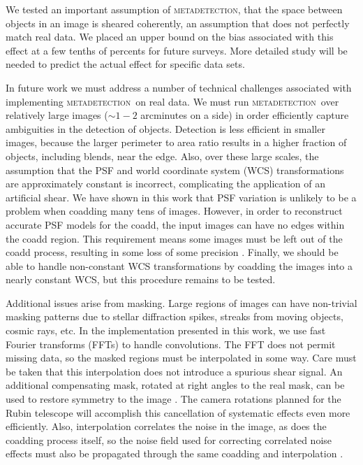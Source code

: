 \documentclass[draft, iop, twocolappendix, appendixfloats, numberedappendix, apj]{hackemulateapj}
\newcommand{\mdet}{\textsc{metadetection}}
\begin{document}
We tested an important assumption of \mdet, that the space between objects in
an image is sheared coherently, an assumption that does not perfectly match
real data.  We placed an upper bound on the bias associated with this effect at
a few tenths of percents for future surveys. More detailed study will be needed
to predict the actual effect for specific data sets.

In future work we must address a number of technical challenges associated with
implementing \mdet\ on real data.  We must run \mdet\ over relatively large
images ($\sim1-2$ arcminutes on a side) in order efficiently capture
ambiguities in the detection of objects.  Detection is less efficient in
smaller images, because the larger perimeter to area ratio results in a higher
fraction of objects, including blends, near the edge.  Also, over these large
scales, the assumption that the PSF and world coordinate system (WCS)
transformations are approximately constant is incorrect, complicating the
application of an artificial shear. We have shown in this work that PSF
variation is unlikely to be a problem when coadding many tens of images.
However, in order to reconstruct accurate PSF models for the coadd, the input
images can have no edges within the coadd region. This requirement means some
images must be left out of the coadd process, resulting in some loss of some
precision \citep{ArmstrongCoadd}. Finally, we should be able to handle
non-constant WCS transformations by coadding the images into a nearly constant
WCS, but this procedure remains to be tested.

Additional issues arise from masking. Large regions of images can have
non-trivial masking patterns due to stellar diffraction spikes, streaks from
moving objects, cosmic rays, etc. In the implementation presented in this work,
we use fast Fourier transforms (FFTs) to handle convolutions. The FFT does not
permit missing data, so the masked regions must be interpolated in some way.
Care must be taken that this interpolation does not introduce a spurious shear
signal.  An additional compensating mask, rotated at right angles to the real
mask, can be used to restore symmetry to the image \citep{SheldonMcal2017}. The
camera rotations planned for the Rubin telescope will accomplish this
cancellation of systematic effects even more efficiently.  Also, interpolation
correlates the noise in the image, as does the coadding process itself, so the
noise field used for correcting correlated noise effects must also be
propagated through the same coadding and interpolation
\citep{SheldonMcal2017,ArmstrongCoadd}.
\end{document}
